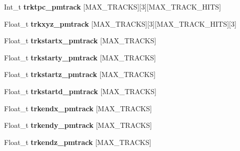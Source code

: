 \begin{DoxyCompactItemize}
\item 
\hypertarget{classanatree_a9c7c79379748df8edd2db8055b236311}{Int\-\_\-t {\bfseries trktpc\-\_\-pmtrack} \mbox{[}M\-A\-X\-\_\-\-T\-R\-A\-C\-K\-S\mbox{]}\mbox{[}3\mbox{]}\mbox{[}M\-A\-X\-\_\-\-T\-R\-A\-C\-K\-\_\-\-H\-I\-T\-S\mbox{]}}\label{classanatree_a9c7c79379748df8edd2db8055b236311}

\item 
\hypertarget{classanatree_a42c839c1c99525e55acb300dd0a7b0be}{Float\-\_\-t {\bfseries trkxyz\-\_\-pmtrack} \mbox{[}M\-A\-X\-\_\-\-T\-R\-A\-C\-K\-S\mbox{]}\mbox{[}3\mbox{]}\mbox{[}M\-A\-X\-\_\-\-T\-R\-A\-C\-K\-\_\-\-H\-I\-T\-S\mbox{]}\mbox{[}3\mbox{]}}\label{classanatree_a42c839c1c99525e55acb300dd0a7b0be}

\item 
\hypertarget{classanatree_ac4b2584b457cd867da7be50a679c8f92}{Float\-\_\-t {\bfseries trkstartx\-\_\-pmtrack} \mbox{[}M\-A\-X\-\_\-\-T\-R\-A\-C\-K\-S\mbox{]}}\label{classanatree_ac4b2584b457cd867da7be50a679c8f92}

\item 
\hypertarget{classanatree_a8140ac679883315316eb95cc748aa834}{Float\-\_\-t {\bfseries trkstarty\-\_\-pmtrack} \mbox{[}M\-A\-X\-\_\-\-T\-R\-A\-C\-K\-S\mbox{]}}\label{classanatree_a8140ac679883315316eb95cc748aa834}

\item 
\hypertarget{classanatree_a2d904b0ad8a98f7245433c628217ac6c}{Float\-\_\-t {\bfseries trkstartz\-\_\-pmtrack} \mbox{[}M\-A\-X\-\_\-\-T\-R\-A\-C\-K\-S\mbox{]}}\label{classanatree_a2d904b0ad8a98f7245433c628217ac6c}

\item 
\hypertarget{classanatree_a2af29172d88ef0b43764c732407fd920}{Float\-\_\-t {\bfseries trkstartd\-\_\-pmtrack} \mbox{[}M\-A\-X\-\_\-\-T\-R\-A\-C\-K\-S\mbox{]}}\label{classanatree_a2af29172d88ef0b43764c732407fd920}

\item 
\hypertarget{classanatree_ac8c7003ec614768a8905c7a0dcde8c97}{Float\-\_\-t {\bfseries trkendx\-\_\-pmtrack} \mbox{[}M\-A\-X\-\_\-\-T\-R\-A\-C\-K\-S\mbox{]}}\label{classanatree_ac8c7003ec614768a8905c7a0dcde8c97}

\item 
\hypertarget{classanatree_ac3cfe62b4181f5d7341bec922338f2f0}{Float\-\_\-t {\bfseries trkendy\-\_\-pmtrack} \mbox{[}M\-A\-X\-\_\-\-T\-R\-A\-C\-K\-S\mbox{]}}\label{classanatree_ac3cfe62b4181f5d7341bec922338f2f0}

\item 
\hypertarget{classanatree_aeadd3b4d6ee38df809b78d3ef664b21a}{Float\-\_\-t {\bfseries trkendz\-\_\-pmtrack} \mbox{[}M\-A\-X\-\_\-\-T\-R\-A\-C\-K\-S\mbox{]}}\label{classanatree_aeadd3b4d6ee38df809b78d3ef664b21a}


\end{DoxyCompactItemize}
